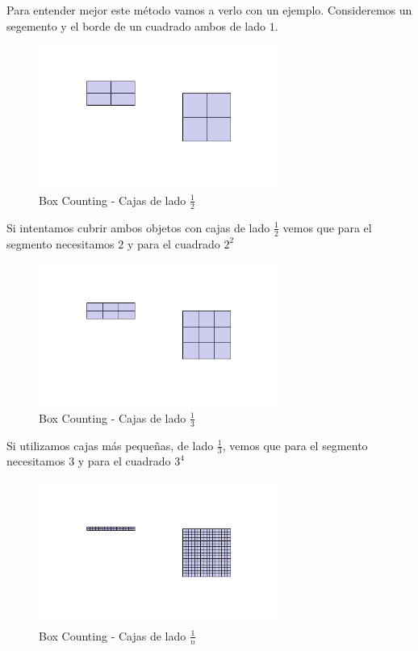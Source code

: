 \noindent Para entender mejor este método vamos a verlo con un ejemplo. Consideremos un segemento y el borde de un cuadrado ambos de lado $1$.

\begin{figure}[H]
    \centering
    \includegraphics[width=0.7\textwidth]{figures/boxcounting-1.png}
    \caption{Box Counting - Cajas de lado $\frac{1}{2}$}
\end{figure}

\noindent Si intentamos cubrir ambos objetos con cajas de lado $\frac{1}{2}$ vemos que para el segmento necesitamos $2$ y para el cuadrado $2^2$

\begin{figure}[H]
    \centering
    \includegraphics[width=0.7\textwidth]{figures/boxcounting-2.png}
    \caption{Box Counting - Cajas de lado $\frac{1}{3}$}
\end{figure}

\noindent Si utilizamos cajas más pequeñas, de lado $\frac{1}{3}$, vemos que para el segmento necesitamos $3$ y para el cuadrado $3^4$

\begin{figure}[H]
    \centering
    \includegraphics[width=0.7\textwidth]{figures/boxcounting-3.png}
    \caption{Box Counting - Cajas de lado $\frac{1}{n}$}
\end{figure}

